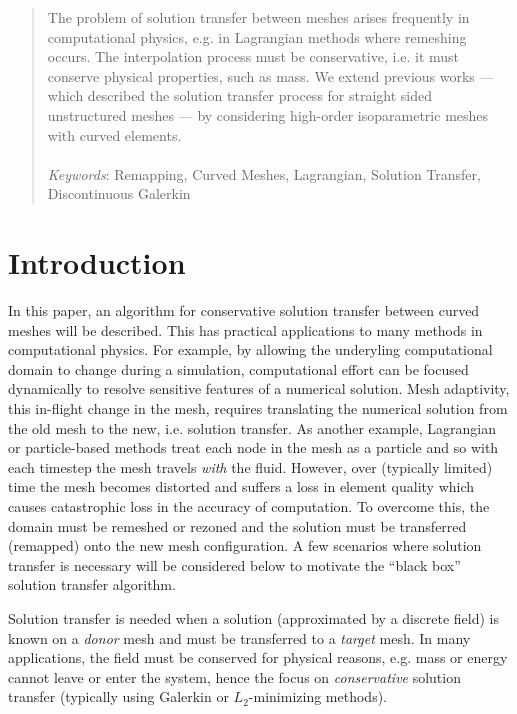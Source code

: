 \documentclass[letterpaper,10pt]{article}
\theoremstyle{definition}
\begin{document}
\begin{abstract}
\noindent The problem of solution transfer between meshes arises frequently in
computational physics, e.g. in Lagrangian methods where remeshing
occurs. The interpolation process must be conservative, i.e. it
must conserve physical properties, such as mass. We extend previous
works --- which described the solution transfer process for straight sided
unstructured meshes --- by considering high-order isoparametric meshes
with curved elements.
\\ \\
\noindent \emph{Keywords}: Remapping, Curved Meshes, Lagrangian,
Solution Transfer, Discontinuous Galerkin
\end{abstract}

\tableofcontents

\section{Introduction}

In this paper, an algorithm for conservative solution transfer between curved
meshes will be described. This has practical applications to many methods in
computational physics. For example, by allowing the underyling
computational domain to change during a simulation, computational
effort can be focused dynamically to resolve sensitive features
of a numerical solution. Mesh adaptivity, this in-flight change in the mesh,
requires translating the numerical solution from the old mesh to the new,
i.e. solution transfer. As another example, Lagrangian or particle-based
methods treat each node in the mesh as a particle and so with each timestep the
mesh travels \emph{with} the fluid.
However, over (typically limited) time the mesh
becomes distorted and suffers a loss in element quality which causes
catastrophic loss in the accuracy of computation. To overcome this, the
domain must be remeshed or rezoned and the solution must be
transferred (remapped) onto the new mesh configuration. A few scenarios
where solution transfer is necessary will be considered below
to motivate the ``black box'' solution transfer algorithm.

Solution transfer is needed when a solution
(approximated by a discrete field) is known on a \emph{donor} mesh and must
be transferred to a \emph{target} mesh. In many applications, the field
must be conserved for physical reasons, e.g. mass or energy cannot leave or
enter the system, hence the focus on \emph{conservative} solution transfer
(typically using Galerkin or \(L_2\)-minimizing methods).
\end{document}
